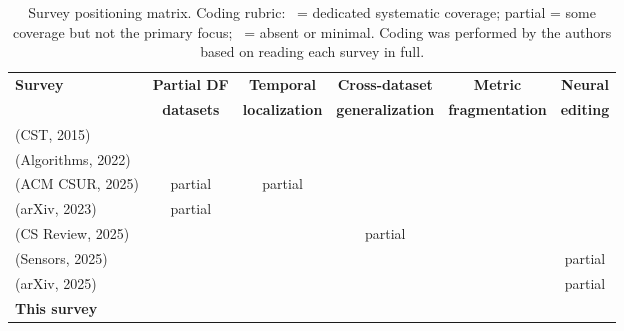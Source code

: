 \documentclass[journal]{IEEEtran}
\newcommand{\cmark}{\ding{51}}
\newcommand{\xmark}{\ding{55}}
\begin{document}
\begin{table}[t]
\centering
\caption{Survey positioning matrix. Coding rubric: \cmark\ = dedicated systematic coverage; partial = some coverage but not the primary focus; \xmark\ = absent or minimal. Coding was performed by the authors based on reading each survey in full.}
\label{tab:survey_positioning}
\small
\begin{tabular}{lccccc}
\toprule
\textbf{Survey} & \textbf{Partial DF} & \textbf{Temporal} & \textbf{Cross-dataset} & \textbf{Metric} & \textbf{Neural} \\
 & \textbf{datasets} & \textbf{localization} & \textbf{generalization} & \textbf{fragmentation} & \textbf{editing} \\
\midrule
\cite{wu2015spoofing} (CST, 2015) & \xmark & \xmark & \xmark & \xmark & \xmark \\
\cite{almutairi2022review} (Algorithms, 2022) & \xmark & \xmark & \xmark & \xmark & \xmark \\
\cite{li2025survey} (ACM CSUR, 2025) & partial & partial & \xmark & \xmark & \xmark \\
\cite{yi2023survey} (arXiv, 2023) & partial & \xmark & \xmark & \xmark & \xmark \\
\cite{pham2025survey} (CS Review, 2025) & \xmark & \xmark & partial & \xmark & \xmark \\
\cite{zhang2025audiosurvey} (Sensors, 2025) & \xmark & \xmark & \xmark & \xmark & partial \\
\cite{he2025mrlsurvey} (arXiv, 2025) & \cmark & \cmark & \xmark & \xmark & partial \\
\textbf{This survey} & \cmark & \cmark & \cmark & \cmark & \cmark \\
\bottomrule
\end{tabular}
\end{table}
\end{document}
